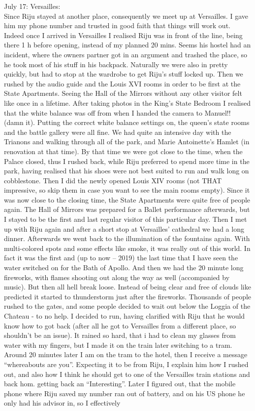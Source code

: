 July 17: Versailles:\\
Since Riju stayed at another place, consequently we meet up at Versailles. I gave him my phone number and trusted in good faith that things will work out. Indeed once I arrived in Versailles I realised Riju was in front of the line, being there 1 h before opening, instead of my planned 20 mins. Seems his hostel had an incident, where the owners partner got in an argument and trashed the place, so he took most of his stuff in his backpack. Naturally we were also in pretty quickly, but had to stop at the wardrobe to get Riju's stuff locked up. Then we rushed by the audio guide and the Louis XVI rooms in order to be first at the State Apartments. Seeing the Hall of the Mirrors without any other visitor felt like once in a lifetime. After taking photos in the King's State Bedroom I realised that the white balance was off from when I handed the camera to Manuel!! (damn it). Putting the correct white balance settings on, the queen's state rooms and the battle gallery were all fine. We had quite an intensive day with the Trianons and walking through all of the park, and Marie Antoinette's Hamlet (in renovation at that time). By that time we were got close to the time, when the Palace closed, thus I rushed back, while Riju preferred to spend more time in the park, having realised that his shoes were not best suited to run and walk long on cobblestone. Then I did the newly opened Louis XIV rooms (not THAT impressive, so skip them in case you want to see the main rooms empty). Since it was now close to the closing time, the State Apartments were quite free of people again. The Hall of Mirrors was prepared for a Ballet performance afterwards, but I stayed to be the first and last regular visitor of this particular day. Then I met up with Riju again and after a short stop at Versailles' cathedral we had a long dinner. Afterwards we went back to the illumination of the fountains again. With multi-colored spots and some effects like smoke, it was really out of this world. In fact it was the first and (up to now -- 2019) the last time that I have seen the water switched on for the Bath of Apollo. And then we had the 20 minute long fireworks, with flames shooting out along the way as well (accompanied by music). But then all hell break loose. Instead of being clear and free of clouds like predicted it started to thunderstorm just after the fireworks. Thousands of people rushed to the gates, and some people decided to wait out below the Loggia of the Chateau - to no help. I decided to run, having clarified with Riju that he would know how to got back (after all he got to Versailles from a different place, so shouldn't be an issue). It rained so hard, that i had to clean my glasses from water with my fingers, but I made it on the train later switching to a tram. Around 20 minutes later I am on the tram to the hotel, then I receive a message ``whereabouts are you''. Expecting it to be from Riju, I explain him how I rushed out, and also how I think he should get to one of the Versailles train stations and back hom. getting back an ``Interesting''. Later I figured out, that the mobile phone where Riju saved my number ran out of battery, and on his US phone he only had his advisor in, so I effectively 